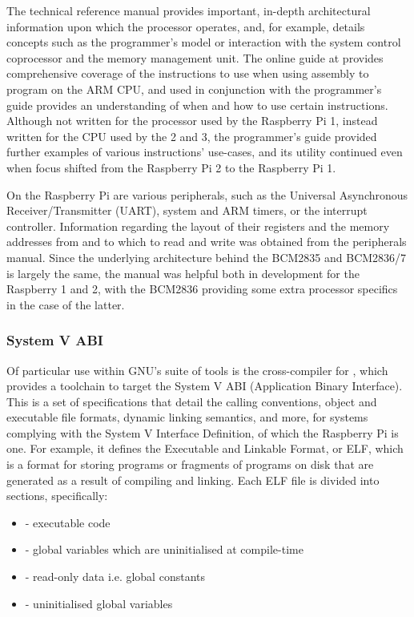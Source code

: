         The technical reference manual provides important, in-depth
        architectural information upon which the processor operates, and, for
        example, details concepts such as the programmer's model or interaction
        with the system control coprocessor and the memory management unit. The
        online guide at \cite{OnlineARMGuide} provides comprehensive coverage of
        the instructions to use when using assembly to program on the ARM CPU,
        and used in conjunction with the programmer's guide provides an
        understanding of when and how to use certain instructions.  Although not
        written for the processor used by the Raspberry Pi 1, instead written
        for the CPU used by the 2 and 3, the programmer's guide provided further
        examples of various instructions' use-cases, and its utility continued
        even when focus shifted from the Raspberry Pi 2 to the Raspberry Pi 1.

        On the Raspberry Pi are various peripherals, such as the Universal
        Asynchronous Receiver/Transmitter (UART), system and ARM timers, or the
        interrupt controller. Information regarding the layout of their
        registers and the memory addresses from and to which to read and write
        was obtained from the peripherals manual. Since the underlying
        architecture behind the BCM2835 and BCM2836/7 is largely the same, the
        manual was helpful both in development for the Raspberry 1 and 2, with
        the BCM2836 \cite{BCM2836} providing some extra processor specifics in
        the case of the latter.

    \subsubsection{System V ABI}
        Of particular use within GNU's suite of tools is the cross-compiler for
        , which provides a toolchain to target the System V
        ABI (Application Binary Interface). This is a set of specifications that
        detail the calling conventions, object and executable file formats,
        dynamic linking semantics, and more, for systems complying with the
        System V Interface Definition, of which the Raspberry Pi is one. For
        example, it defines the Executable and Linkable Format, or ELF, which is
        a format for storing programs or fragments of programs on disk that are
        generated as a result of compiling and linking. Each ELF file is divided
        into sections, specifically:
        \begin{itemize}
            \label{list:LinkerSections}
            \itemsep0em
            \item {} - executable code
            \item {} - global variables which are uninitialised at
                compile-time
            \item {} - read-only data i.e. global constants
            \item {} - uninitialised global variables
        \end{itemize}

